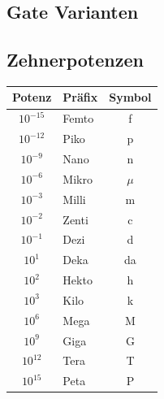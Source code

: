 \subsection{Gate Varianten}
\begin{center}
\end{center}

\subsection{Zehnerpotenzen}
\begin{center}
    \renewcommand{\arraystretch}{1.25}
    \begin{tabular}{|clc|}
        \hline
        \rowcolor{white}
        Potenz & Präfix & Symbol\\
        \hline
        $10^{-15}$   &   Femto   &   f       \\
        $10^{-12}$   &   Piko    &   p       \\
        $10^{-9}$    &   Nano    &   n       \\
        $10^{-6}$    &   Mikro   &   $\mu$   \\
        $10^{-3}$    &   Milli   &   m       \\
        $10^{-2}$    &   Zenti   &   c       \\
        $10^{-1}$    &   Dezi    &   d       \\
        \hline
        $10^1$     &   Deka    &   da      \\
        $10^2$     &   Hekto   &   h       \\
        $10^3$     &   Kilo    &   k       \\
        $10^6$     &   Mega    &   M       \\
        $10^9$     &   Giga    &   G       \\
        $10^{12}$  &   Tera    &   T       \\
        $10^{15}$  &   Peta    &   P       \\
        \hline
    \end{tabular}
\end{center}

